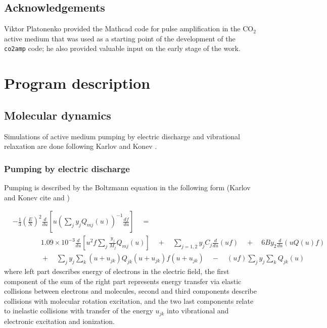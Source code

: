 \documentclass{report}
\begin{document}
\section{Acknowledgements}
Viktor Platonenko provided the Mathcad code for pulse amplification in the CO$_2$ active medium that was used as a starting point of the development of the \texttt{co2amp} code; he also provided valuable input on the early stage of the work.

\chapter{Program description}

\section{Molecular dynamics}
Simulations of active medium pumping by electric discharge and vibrational relaxation are done following Karlov and Konev \cite{Karlov-1978}.

\subsection{Pumping by electric discharge}
Pumping is described by the Boltzmann equation in the following form (Karlov and Konev cite \cite{Holstein-1946} and \cite{Nighan-1970})

\begin{align}\label{eq:boltzmann}
&- \frac{1}{3} \left(\frac{E}{N}\right)^2 \frac{d}{du} \left[u \left( \sum\limits_j y_j Q_{mj}(u) \right)^{-1}\frac{df}{du} \right] \quad = \nonumber \\
&\qquad \qquad 1.09 \times 10^{ - 3}\frac{d}{du}\left[ u^2 f\sum\limits_j \frac{y_j}{M_j} Q_{mj}(u) \right]
\quad  + \quad \sum\limits_{j = 1,2} {y_j}{C_j} \frac{d}{du}(uf)
\quad  + \quad 6B y_2 \frac{d}{du}\left(uQ(u)f \right)\nonumber \\
&\qquad \qquad +\quad\sum\limits_j y_j \sum\limits_k (u + u_{jk})Q_{jk} (u + u_{jk})f(u + u_{jk}) \quad  - \quad (uf)\sum\limits_j y_j \sum\limits_k Q_{jk}(u)
\end{align}
where left part describes energy of electrons in the electric field, the first component of the sum of the right part represents energy transfer via elastic collisions between electrons and molecules, second and third components describe collisions with molecular rotation excitation, and the two last components relate to inelastic collisions with transfer of the energy $u_{jk}$ into vibrational and electronic excitation and ionization.
\end{document}
